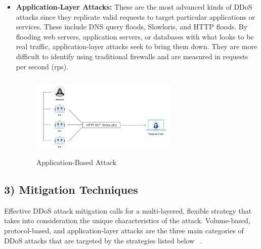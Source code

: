 \documentclass[conference]{IEEEtran}
\begin{document}
\begin{itemize}
    \item \textbf{Application-Layer Attacks:} These are the most advanced kinds of DDoS attacks since they replicate valid requests to target particular applications or services. These include DNS query floods, Slowloris, and HTTP floods. By flooding web servers, application servers, or databases with what looks to be real traffic, application-layer attacks seek to bring them down. They are more difficult to identify using traditional firewalls and are measured in requests per second (rps).

    \begin{figure}[htbp]
    \centerline{\includegraphics[height=4cm,width=7cm]{ApplicationAttack.JPG}}
    \caption{Application-Based Attack~\cite{13}}
    \label{fig:application_attack}
    \end{figure}
\end{itemize}



\subsection*{3) Mitigation Techniques}

Effective DDoS attack mitigation calls for a multi-layered, flexible strategy that takes into consideration the unique characteristics of the attack. Volume-based, protocol-based, and application-layer attacks are the three main categories of DDoS attacks that are targeted by the strategies listed below ~\cite{14}.
\end{document}
